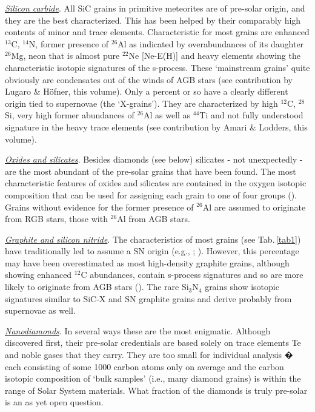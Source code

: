 \documentclass{iau}
\begin{document}
{\underline{\it Silicon carbide}}. All SiC grains in primitive meteorites are of pre-solar origin, and they are
the best characterized. This has been helped by their comparably high contents of minor and
trace elements. Characteristic for most grains are enhanced $^{13}$C, $^{14}$N, former presence of $^{26}$Al
as indicated by overabundances of its daughter $^{26}$Mg, neon that is almost pure $^{22}$Ne 
[Ne-E(H)]
and heavy elements showing the characteristic isotopic signatures of the s-process. These
`mainstream grains' quite obviously are condensates out of the winds of AGB stars (see
contribution by Lugaro \& H{\"o}fner, this volume). Only a percent or so have a clearly different origin tied to
supernovae (the `X-grains'). They are characterized by high $^{12}$C, $^{28}$Si, very high former
abundances of $^{26}$Al as well as $^{44}$Ti and not fully understood signature in the heavy trace
elements (see contribution by Amari \& Lodders, this volume).

{\underline{\it Oxides and silicates}}. Besides diamonds (see below) silicates - not unexpectedly - are the
most abundant of the pre-solar grains that have been found. The most characteristic features
of oxides and silicates are contained in the oxygen isotopic composition that can be used for
assigning each grain to one of four groups 
(\cite[Nittler et al. 1997]{Nittler_etal97}). Grains without evidence for
the former presence of $^{26}$Al are assumed to originate from RGB stars, those with $^{26}$Al from AGB stars.

{\underline{\it Graphite and silicon nitride}}. The characteristics of most grains (see Tab.\,\ref{tab1}) have
traditionally led to assume a SN origin (e.g., 
\cite[Zinner 1998]{Zinner98}; 
\cite[Hoppe \& Zinner 2000]{HoppeZinner00}). 
However,
this percentage may have been overestimated as most high-density graphite grains, although
showing enhanced $^{12}$C abundances, contain s-process signatures and so are more likely to
originate from AGB stars 
(\cite[Croat et al.  2005]{Croat_etal05}). The rare Si$_3$N$_4$ grains show isotopic signatures
similar to SiC-X and SN graphite grains and derive probably from supernovae as well.

{\underline{\it Nanodiamonds}}. In several ways these are the most enigmatic. Although discovered first,
their pre-solar credentials are based solely on trace elements Te and noble gases that they
carry. They are too small for individual analysis � each consisting of some 1000 carbon atoms
only on average and the carbon isotopic composition of `bulk samples' (i.e., many diamond
grains) is within the range of Solar System materials. What fraction of the diamonds is truly
pre-solar is an as yet open question.
\end{document}
